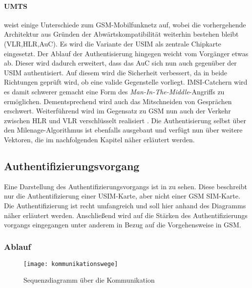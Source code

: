 \paragraph{UMTS} weist einige Unterschiede zum GSM-Mobilfunknetz auf, wobei die
vorhergehende Architektur aus Gründen der Abwärtskompatibilität weiterhin bestehen bleibt
(\ac{VLR},\ac{HLR},\ac{AuC}). Es wird die Variante der USIM als zentrale Chipkarte
eingesetzt. Der Ablauf der Authentisierung hingegen weicht vom Vorgänger etwas ab.
Dieser wird dadurch erweitert, dass das \ac{AuC} sich nun auch gegenüber der \ac{USIM}
authentisiert. Auf diesem wird die Sicherheit verbessert, da in beide Richtungen
geprüft wird, ob eine valide Gegenstelle vorliegt. \ac{IMSI}-Catchern wird es damit
schwerer gemacht eine Form des \textit{Man-In-The-Middle}-Angriffs zu ermöglichen.
Dementsprechend wird auch das Mitschneiden von Gesprächen erschwert. Weiterführend
wird im Gegensatz zu \ac{GSM} nun auch der Verkehr zwischen \ac{HLR} und \ac{VLR}
verschlüsselt realisiert \cite{spitz11}.
Die Authentisierung selbst über den Milenage-Algorithmus ist ebenfalls ausgebaut
und verfügt nun über weitere Vektoren, die im nachfolgenden Kapitel näher
erläutert werden.

\subsection{Authentifizierungsvorgang}
\label{authentifizierungsvorgang}

Eine Darstellung des Authentifizierungsvorgangs ist in  zu
sehen. Diese beschreibt nur die Authentifizierung einer \ac{USIM}-Karte, aber nicht einer
GSM \ac{SIM}-Karte. \\
Die Authentifizierung ist recht umfangreich und soll hier anhand des Diagramms näher
erläutert werden. Anschließend wird auf die Stärken des Authentifizierungs\-
vorgangs eingegangen unter anderem in Bezug auf die Vorgehensweise in GSM.

 \subsubsection{Ablauf}
 
 \begin{figure}[htp]
 \begin{center}
  \texttt{[image: kommunikationswege]}
 \end{center}
 \caption[Sequenzdiagramm über die Kommunikation zwischen SIM-Karte und Authentication Center]{Sequenzdiagramm über die Kommunikation}
 \label{fig:kommunikationswege}
\end{figure}

